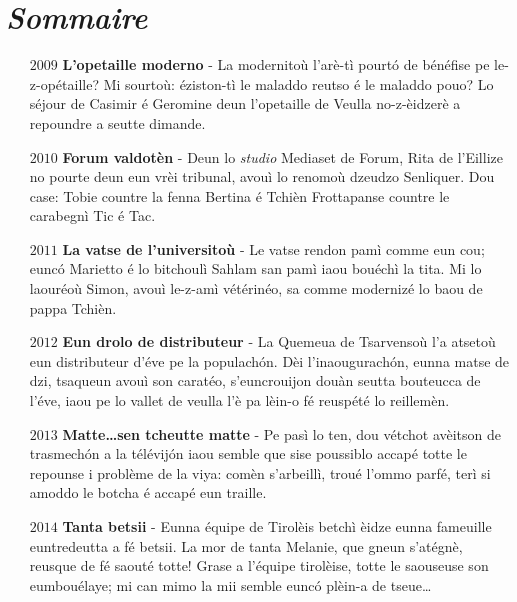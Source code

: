 \chapter*{\textit{Sommaire}}
\begin{itemize}
\item[$2009$] \textbf{L'opetaille moderno} - La modernitoù l'arè-tì pourt\'o de bénéfise pe le-z-opétaille? Mi sourtoù: éziston-tì le maladdo reutso é le maladdo pouo? Lo séjour de Casimir é Geromine deun l'opetaille de Veulla no-z-èidzerè a repoundre a seutte dimande.\newline
\item[$2010$] \textbf{Forum valdotèn} - Deun lo \textit{studio} Mediaset de Forum, Rita de l'Eillize no pourte deun eun vrèi tribunal, avouì lo renomoù dzeudzo Senliquer. Dou case: Tobie countre la fenna Bertina é Tchièn Frottapanse countre le carabegnì Tic é Tac.\newline

\item[$2011$] \textbf{La vatse de l'universitoù} - Le vatse rendon pamì com\-me eun cou; eunc\'o Marietto é lo bitchoulì Sahlam san pamì iaou bouéchì la tita. Mi lo laouréoù Simon, avouì le-z-amì vétérinéo, sa comme modernizé lo baou de pappa Tchièn. \newline

\item[$2012$] \textbf{Eun drolo de distributeur} - La Quemeua de Tsarvensoù l'a atsetoù eun distributeur d'éve pe la populach\'on. Dèi l'inaougurach\'on, eunna matse de dzi, tsaqueun avouì son caratéo, s'euncrouijon douàn seutta bouteucca de l'éve, iaou pe lo vallet de veulla l'è pa lèin-o fé reuspété lo reillemèn.
\newline

\item[$2013$] \textbf{Matte\ldots sen tcheutte matte} - Pe pasì lo ten, dou vé\-tchot avèitson de trasmech\'on a la télévij\'on iaou sem\-ble que sise poussiblo accapé totte le repounse i problème de la viya: comèn s'arbeillì, troué l'ommo parfé, terì si amoddo le bo\-tcha é accapé eun traille.\newline

\item[$2014$] \textbf{Tanta betsii} - Eunna équipe de Tirolèis betchì èidze eunna fameuille euntredeutta a fé betsii. La mor de tanta Melanie, que gneun s'atégnè, reusque de fé saouté totte! Grase a l'équipe tirolèise, totte le saouseuse son eumbouélaye; mi can mimo la mii semble eunc\'o plèin-a de tseue\ldots\newline


\end{itemize}
